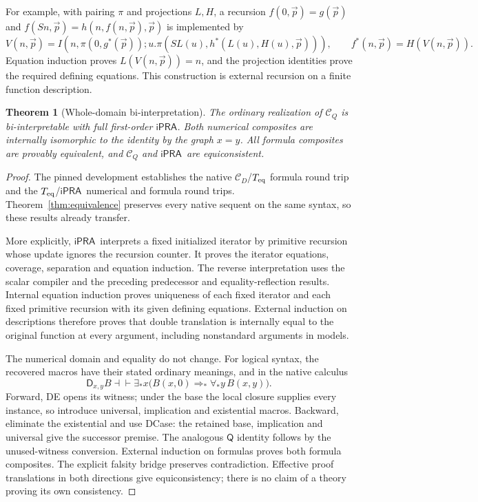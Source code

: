 \documentclass[11pt,letterpaper]{article}
\newtheorem{theorem}{Theorem}[section]
\theoremstyle{definition}\newtheorem{definition}[theorem]{Definition}
\theoremstyle{remark}\newtheorem{remark}[theorem]{Remark}
\newcommand{\ipra}{\ensuremath{\mathsf{iPRA}}}
\newcommand{\CD}{\mathcal C_D}
\newcommand{\CQ}{\mathcal C_Q}
\newcommand{\D}{\mathsf D}
\newcommand{\Q}{\mathsf Q}
\begin{document}
For example, with pairing $\pi$ and projections $L,H$, a recursion
$f(0,\vec p)=g(\vec p)$ and
$f(Sn,\vec p)=h(n,f(n,\vec p),\vec p)$ is implemented by
\[
 V(n,\vec p)=I\!\left(n,\pi(0,g^*(\vec p));
 u.\pi(SL(u),h^*(L(u),H(u),\vec p))\right),
 \qquad f^*(n,\vec p)=H(V(n,\vec p)).
\]
Equation induction proves $L(V(n,\vec p))=n$, and the projection
identities prove the required defining equations. This construction is
external recursion on a finite function description.

\begin{theorem}[Whole-domain bi-interpretation]
The ordinary realization of $\CQ$ is bi-interpretable with full
first-order \ipra. Both numerical composites are internally isomorphic
to the identity by the graph $x=y$. All formula composites are provably
equivalent, and $\CQ$ and \ipra\ are equiconsistent.
\end{theorem}
\begin{proof}
The pinned development establishes the native $\CD$/$T_{\rm eq}$
formula round trip and the $T_{\rm eq}$/\ipra\ numerical and formula
round trips. Theorem~\ref{thm:equivalence} preserves every native
sequent on the same syntax, so these results already transfer.

More explicitly, \ipra\ interprets a fixed initialized iterator by
primitive recursion whose update ignores the recursion counter. It proves
the iterator equations, coverage, separation and equation induction.
The reverse interpretation uses the scalar compiler and the preceding
predecessor and equality-reflection results. Internal equation induction
proves uniqueness of each fixed iterator and each fixed primitive
recursion with its given defining equations. External induction on
descriptions therefore proves that double translation is internally
equal to the original function at every argument, including nonstandard
arguments in models.

The numerical domain and equality do not change. For logical syntax,
the recovered macros have their stated ordinary meanings, and in the
native calculus
\[
 \D_{x,y}B\dashv\vdash
 \exists_*x\bigl(B(x,0)\Rightarrow_*\forall_*y\,B(x,y)\bigr).
\]
Forward, DE opens its witness; under the base the local closure supplies
every instance, so introduce universal, implication and existential
macros. Backward, eliminate the existential and use DCase: the retained
base, implication and universal give the successor premise. The analogous
$\Q$ identity follows by the unused-witness conversion. External induction
on formulas proves both formula composites. The explicit falsity bridge
preserves contradiction. Effective proof translations in both directions
give equiconsistency; there is no claim of a theory proving its own
consistency.
\end{proof}
\end{document}
